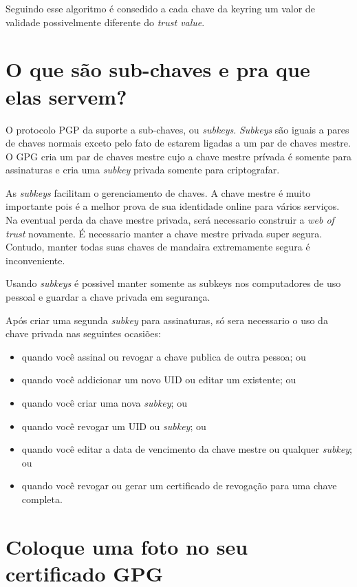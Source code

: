 \documentclass[12pt, letterpaper]{article}
\begin{document}
Seguindo esse algoritmo é consedido a cada chave da keyring um valor de validade possivelmente
diferente do \textit{trust value}.

\section{O que são sub-chaves e pra que elas servem?}

O protocolo PGP da suporte a sub-chaves, ou \textit{subkeys}. \textit{Subkeys} são iguais a
pares de chaves normais exceto pelo fato de estarem ligadas a um par de chaves mestre.
O GPG cria um par de chaves mestre cujo a chave mestre prívada é somente para assinaturas
e cria uma \textit{subkey} privada somente para criptografar.

As \textit{subkeys} facilitam o gerenciamento de chaves. A chave mestre é muito importante
pois é a melhor prova de sua identidade online para vários serviços. Na eventual perda da
chave mestre privada, será necessario construir a \textit{web of trust} novamente.
É necessario manter a chave mestre privada super segura. Contudo, manter todas suas chaves
de mandaira extremamente segura é inconveniente.

Usando \textit{subkeys} é possivel manter somente as subkeys nos computadores de uso pessoal
e guardar a chave privada em segurança.

Após criar uma segunda \textit{subkey} para assinaturas, só sera necessario o uso da chave privada
nas seguintes ocasiões:
\begin{itemize}
  \item quando você assinal ou revogar a chave publica de outra pessoa; ou
  \item quando você addicionar um novo UID ou editar um existente; ou
  \item quando você criar uma nova \textit{subkey}; ou
  \item quando você revogar um UID ou \textit{subkey}; ou
  \item quando você editar a data de vencimento da chave mestre ou qualquer \textit{subkey}; ou
  \item quando você revogar ou gerar um certificado de revogação para uma chave completa.
\end{itemize}

\section{Coloque uma foto no seu certificado GPG}
\end{document}
